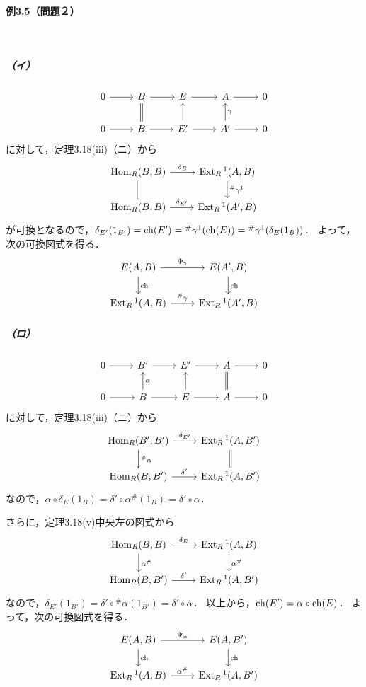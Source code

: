 \paragraph{例3.5（問題２）}~
\subparagraph{（イ）}
\[
\begin{tikzcd}
  0 \arrow[r] & B \arrow[r]\arrow[d, equal] & E \arrow[r] & A \arrow[r] & 0 \\
  0 \arrow[r] & B \arrow[r] & E' \arrow[r]\arrow[u] & A' \arrow[r]\arrow[u, "\gamma"'] & 0
\end{tikzcd}
\]
に対して，定理3.18(iii)（ニ）から
\[
\begin{tikzcd}
  \Hom_R(B, B) \arrow[r, "\delta_E"]\arrow[d, equal] & \Ext_R{}^1(A, B) \arrow[d, "{}^\#\gamma^1"] \\
  \Hom_R(B, B) \arrow[r, "\delta_{E'}"] & \Ext_R{}^1(A', B)
\end{tikzcd}
\]
が可換となるので，$\delta_{E'}(1_{B'}) = \operatorname{ch}(E') = {}^\#\gamma^1 (\operatorname{ch}(E)) = {}^\#\gamma^1 (\delta_E(1_B))$．
よって，次の可換図式を得る．
\[
\begin{tikzcd}
  E(A, B) \arrow[r, "\Phi_\gamma"]\arrow[d, "\ch"] & E(A', B)\arrow[d, "\ch"] \\
  \Ext_R{}^1(A, B) \arrow[r, "^\#\gamma"] & \Ext_R{}^1(A', B)
\end{tikzcd}
\]

\subparagraph{（ロ）}
\[
\begin{tikzcd}
  0 \arrow[r] & B' \arrow[r] & E' \arrow[r] & A \arrow[r]\arrow[d, equal] & 0 \\
  0 \arrow[r] & B \arrow[r]\arrow[u, "\alpha"'] & E \arrow[r]\arrow[u] & A \arrow[r] & 0
\end{tikzcd}
\]
に対して，定理3.18(iii)（ニ）から
\[
\begin{tikzcd}
  \Hom_R(B', B') \arrow[r, "\delta_{E'}"]\arrow[d, "^\#\alpha"] & \Ext_R{}^1(A, B') \arrow[d, equal] \\
  \Hom_R(B, B') \arrow[r, "\delta'"] & \Ext_R{}^1(A, B')
\end{tikzcd}
\]
なので，$\alpha \circ \delta_E(1_B) = \delta' \circ \alpha^\# (1_B) = \delta' \circ \alpha$．

さらに，定理3.18(v)中央左の図式から
\[
\begin{tikzcd}
  \Hom_R(B, B) \arrow[r, "\delta_E"]\arrow[d, "\alpha^\#"] & \Ext_R{}^1(A, B) \arrow[d, "\alpha^\#"] \\
  \Hom_R(B, B') \arrow[r, "\delta'"] & \Ext_R{}^1(A, B')
\end{tikzcd}
\]
なので，$\delta_{E'}(1_{B'}) = \delta' \circ {}^\#\alpha (1_{B'}) = \delta' \circ \alpha$．
以上から，$\operatorname{ch}(E') = \alpha \circ \operatorname{ch}(E)$．
よって，次の可換図式を得る．
\[
\begin{tikzcd}
  E(A, B) \arrow[r, "\Psi_\alpha"]\arrow[d, "\ch"] & E(A, B')\arrow[d, "\ch"] \\
  \Ext_R{}^1(A, B) \arrow[r, "\alpha^\#"] & \Ext_R{}^1(A, B')
\end{tikzcd}
\]

